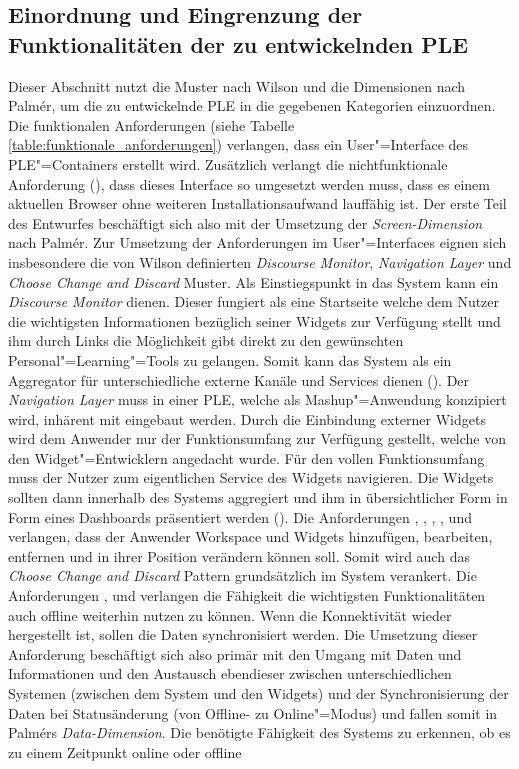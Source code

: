 \subsection{Einordnung und Eingrenzung der Funktionalitäten der zu entwickelnden \ac{PLE}}
Dieser Abschnitt nutzt die Muster nach Wilson und die Dimensionen nach Palmér, um die zu entwickelnde \ac{PLE} in die gegebenen Kategorien einzuordnen.
Die funktionalen Anforderungen (siehe Tabelle \ref{table:funktionale_anforderungen}) verlangen, dass ein User"=Interface des \ac{PLE}"=Containers erstellt wird. Zusätzlich verlangt die nichtfunktionale Anforderung (), dass dieses Interface so umgesetzt werden muss, dass es einem aktuellen Browser ohne weiteren Installationsaufwand lauffähig ist. Der erste Teil des Entwurfes beschäftigt sich also mit der Umsetzung der \emph{Screen-Dimension} nach Palmér. Zur Umsetzung der Anforderungen im User"=Interfaces eignen sich insbesondere die von Wilson definierten \emph{Discourse Monitor}, \emph{Navigation Layer} und \emph{Choose Change and Discard} Muster. Als Einstiegspunkt in das System kann ein \emph{Discourse Monitor} dienen. Dieser fungiert als eine Startseite welche dem Nutzer die wichtigsten Informationen bezüglich seiner Widgets zur Verfügung stellt  und ihm durch Links die Möglichkeit gibt direkt zu den gewünschten Personal"=Learning"=Tools zu gelangen. Somit kann das System als ein Aggregator für unterschiedliche externe Kanäle und Services dienen (). Der \emph{Navigation Layer} muss in einer \ac{PLE}, welche als Mashup"=Anwendung konzipiert wird, inhärent mit eingebaut werden. Durch die Einbindung externer Widgets wird dem Anwender nur der Funktionsumfang zur Verfügung gestellt, welche von den Widget"=Entwicklern angedacht wurde. Für den vollen Funktionsumfang muss der Nutzer zum eigentlichen Service des Widgets navigieren. Die Widgets sollten dann innerhalb des Systems aggregiert und ihm in übersichtlicher Form in Form eines Dashboards präsentiert werden (). Die Anforderungen , , , ,  und  verlangen, dass der Anwender Workspace und Widgets hinzufügen, bearbeiten, entfernen und in ihrer Position verändern können soll. Somit wird auch das \emph{Choose Change and Discard} Pattern grundsätzlich im System verankert. Die Anforderungen ,  und  verlangen die Fähigkeit die wichtigsten Funktionalitäten auch offline weiterhin nutzen zu können. Wenn die Konnektivität wieder hergestellt ist, sollen die Daten synchronisiert werden. Die Umsetzung dieser Anforderung beschäftigt sich also primär mit den Umgang mit Daten und Informationen und den Austausch ebendieser zwischen unterschiedlichen Systemen (zwischen dem System und den Widgets) und der Synchronisierung der Daten bei Statusänderung (von Offline- zu Online"=Modus) und fallen somit in Palmérs \emph{Data-Dimension}. Die benötigte Fähigkeit des Systems zu erkennen, ob es zu einem Zeitpunkt online oder offline 